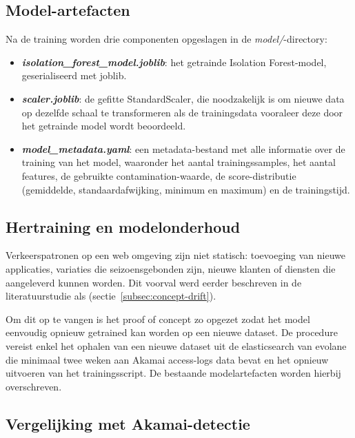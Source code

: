 \subsection{Model-artefacten} 
\label{subsec:model-artefacten}

Na de training worden drie componenten opgeslagen in de \textit{model/}-directory:

\begin{itemize}
    \item \textbf{\textit{isolation\_forest\_model.joblib}}: het getrainde Isolation Forest-model, geserialiseerd met joblib.
    \item \textbf{\textit{scaler.joblib}}: de gefitte StandardScaler, die noodzakelijk is om nieuwe data op dezelfde schaal te transformeren als de trainingsdata vooraleer deze door het getrainde model wordt beoordeeld.
    \item \textbf{\textit{model\_metadata.yaml}}: een metadata-bestand met alle informatie over de training van het model, waaronder het aantal trainingssamples, het aantal features, de gebruikte contamination-waarde, de score-distributie (gemiddelde, standaardafwijking, minimum en maximum) en de trainingstijd.
\end{itemize}

\subsection{Hertraining en modelonderhoud}
\label{subsec:hertraining-modelonderhoud}

Verkeerspatronen op een web omgeving zijn niet statisch: toevoeging van nieuwe applicaties, variaties die seizoensgebonden zijn, nieuwe klanten of diensten die aangeleverd kunnen worden. Dit voorval werd eerder beschreven in de literatuurstudie als (sectie~\ref{subsec:concept-drift}). 

Om dit op te vangen is het proof of concept zo opgezet zodat het model eenvoudig opnieuw getrained kan worden op een nieuwe dataset. De procedure vereist enkel het ophalen van een nieuwe dataset uit de elasticsearch van evolane die minimaal twee weken aan Akamai access-logs data bevat en het opnieuw uitvoeren van het trainingsscript. De bestaande modelartefacten worden hierbij overschreven. 


\subsection{Vergelijking met Akamai-detectie}
\label{subsec:validatie-akamai}
 
